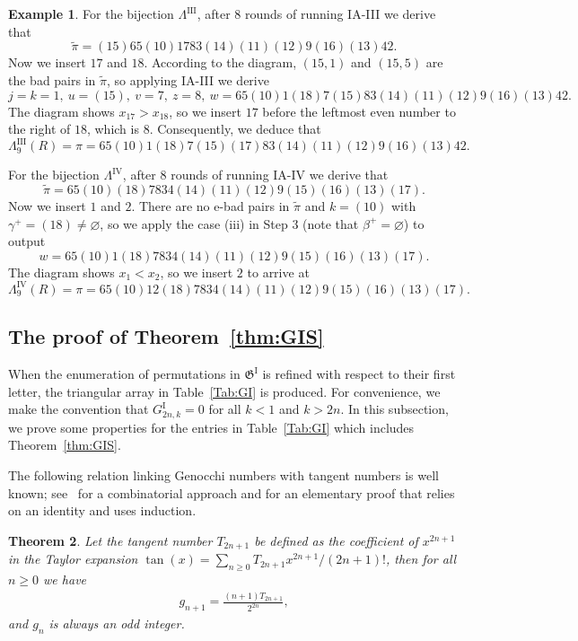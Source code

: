 \documentclass[11pt,reqno]{amsart}
\numberwithin{equation}{section}
\theoremstyle{plain}
\newtheorem{theorem}{Theorem}[section]
\theoremstyle{definition}
\newtheorem{example}[theorem]{Example}
\newcommand{\fG}{\mathfrak{G}}
\newcommand{\GI}{\fG^{\mathrm{I}}}
\newcommand{\Gi}{G^{\mathrm{I}}}
\newcommand{\LIII}{\Lambda^{\mathrm{III}}}
\newcommand{\LIV}{\Lambda^{\mathrm{IV}}}
\begin{document}
\begin{example}
 	For the bijection $\LIII$, after $8$ rounds of running IA-III we derive that 
 	$$\tilde{\pi}=(15)65(10)1783(14)(11)(12)9(16)(13)42.$$
 	Now we insert $17$ and $18$. According to the diagram, $(15,1)$ and $(15,5)$ are the bad pairs in $\tilde{\pi}$, so applying IA-III we derive 
 	$$j=k=1,~u=(15),~v=7,~z=8, 
 	~w=65(10)1(18)7(15)83(14)(11)(12)9(16)(13)42.$$
 	The diagram shows $x_{17}>x_{18}$, so we insert $17$ before the leftmost even number to the right of $18$, which is $8$. Consequently, we deduce that
 	$$\LIII_9(R)=\pi=65(10)1(18)7(15)(17)83(14)(11)(12)9(16)(13)42.$$ 
 	
 	For the bijection $\LIV$, after $8$ rounds of running IA-IV we derive that 
 	$$\tilde{\pi}=65(10)(18)7834(14)(11)(12)9(15)(16)(13)(17).$$
 	Now we insert $1$ and $2$. There are no e-bad pairs in $\tilde{\pi}$ and $k=(10)$ with $\gamma^{+}=(18)\neq\varnothing$, so we apply the case (iii) in Step 3 (note that $\beta^{+}=\varnothing$) to output $$w=65(10)1(18)7834(14)(11)(12)9(15)(16)(13)(17).$$ 
 	The diagram shows $x_1<x_2$, so we insert $2$ to arrive at
 	$$\LIV_9(R)=\pi=65(10)12(18)7834(14)(11)(12)9(15)(16)(13)(17).$$
 \end{example}



\subsection{The proof of Theorem~\ref{thm:GIS}}
When the enumeration of permutations in $\GI$ is refined with respect to their first letter, the triangular array in Table~\ref{Tab:GI} is produced. For convenience, we make the convention that $\Gi_{2n,k}=0$ for all $k<1$ and $k>2n$. In this subsection, we prove some properties for the entries in Table~\ref{Tab:GI} which includes Theorem~\ref{thm:GIS}.

The following relation linking Genocchi numbers with tangent numbers is well known; see~\cite{HL18} for a combinatorial approach and \cite{ZLZ25} for an elementary proof that relies on an identity and uses induction.
\begin{theorem}
Let the tangent number $T_{2n+1}$ be defined as the coefficient of $x^{2n+1}$ in the Taylor expansion $\tan(x)=\sum_{n\ge 0}T_{2n+1}x^{2n+1}/(2n+1)!$, then for all $n\ge 0$ we have
\begin{align*}
g_{n+1} = \frac{(n+1)T_{2n+1}}{2^{2n}},
\end{align*}
and $g_n$ is always an odd integer.
\end{theorem}
\end{document}
